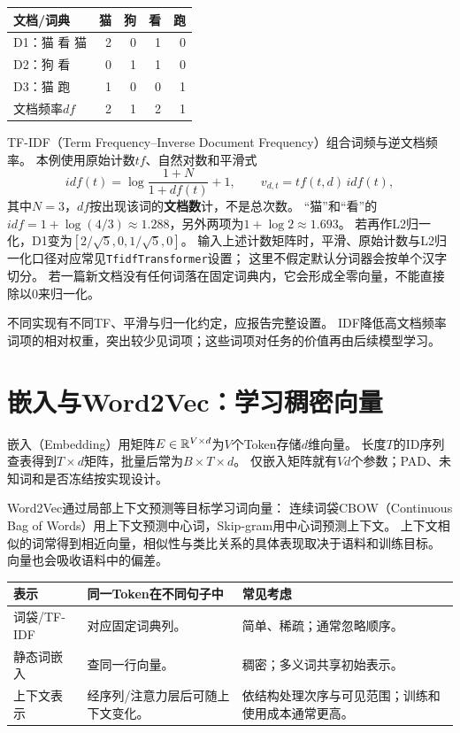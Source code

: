 \begin{center}
\begin{tabular}{lrrrr}
\toprule
文档/词典 & 猫 & 狗 & 看 & 跑\\
\midrule
D1：猫 看 猫 & 2 & 0 & 1 & 0\\
D2：狗 看 & 0 & 1 & 1 & 0\\
D3：猫 跑 & 1 & 0 & 0 & 1\\
文档频率$df$ & 2 & 1 & 2 & 1\\
\bottomrule
\end{tabular}
\end{center}

TF-IDF（Term Frequency--Inverse Document Frequency）组合词频与逆文档频率。
本例使用原始计数$tf$、自然对数和平滑式
\[
 idf(t)=\log\frac{1+N}{1+df(t)}+1,\qquad v_{d,t}=tf(t,d)\,idf(t),
\]
其中$N=3$，$df$按出现该词的\textbf{文档数}计，不是总次数。
“猫”和“看”的$idf=1+\log(4/3)\approx1.288$，另外两项为$1+\log2\approx1.693$。
若再作L2归一化，D1变为$[2/\sqrt5,0,1/\sqrt5,0]$。
输入上述计数矩阵时，平滑、原始计数与L2归一化口径对应常见\texttt{TfidfTransformer}设置；
这里不假定默认分词器会按单个汉字切分。
若一篇新文档没有任何词落在固定词典内，它会形成全零向量，不能直接除以0来归一化。

不同实现有不同TF、平滑与归一化约定，应报告完整设置。
IDF降低高文档频率词项的相对权重，突出较少见词项；这些词项对任务的价值再由后续模型学习。


\section{嵌入与Word2Vec：学习稠密向量}
\label{sec:text-embedding}
嵌入（Embedding）用矩阵$E\in\mathbb{R}^{V\times d}$为$V$个Token存储$d$维向量。
长度$T$的ID序列查表得到$T\times d$矩阵，批量后常为$B\times T\times d$。
仅嵌入矩阵就有$Vd$个参数；PAD、未知词和是否冻结按实现设计。

Word2Vec通过局部上下文预测等目标学习词向量：
连续词袋CBOW（Continuous Bag of Words）用上下文预测中心词，Skip-gram用中心词预测上下文。
上下文相似的词常得到相近向量，相似性与类比关系的具体表现取决于语料和训练目标。
向量也会吸收语料中的偏差。

\begin{center}
\begin{tabularx}{\textwidth}{P{35mm}YY}
\toprule
表示 & 同一Token在不同句子中 & 常见考虑\\
\midrule
词袋/TF-IDF & 对应固定词典列。 & 简单、稀疏；通常忽略顺序。\\
静态词嵌入 & 查同一行向量。 & 稠密；多义词共享初始表示。\\
上下文表示 & 经序列/注意力层后可随上下文变化。 & 依结构处理次序与可见范围；训练和使用成本通常更高。\\
\bottomrule
\end{tabularx}
\end{center}

